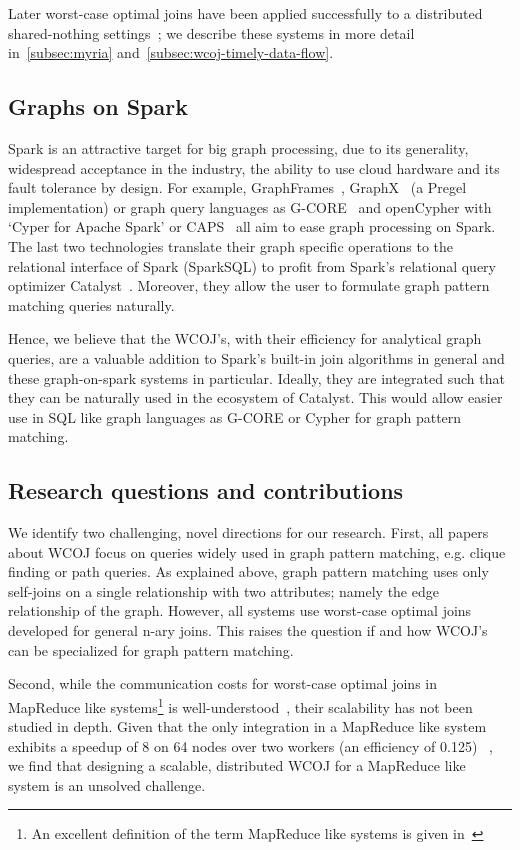 Later worst-case optimal joins have been applied successfully to a distributed shared-nothing settings~\cite{myria-detailed,
ammar2018distributed};
we describe these systems in more detail in~\cref{subsec:myria} and~\ref{subsec:wcoj-timely-data-flow}.

\subsection{Graphs on Spark}\label{subsec:graphs-on-spark}
Spark is an attractive target for big graph processing, due to its generality, widespread acceptance in the industry, the ability to use
cloud hardware and its fault tolerance by design.
For example, GraphFrames~\cite{graphframe}, GraphX~\cite{graphx} (a Pregel~\cite{pregel} implementation) or graph query languages
as \mbox{G-CORE}~\cite{gcore} and \mbox{openCypher} with `Cyper for Apache Spark' or \textsc{CAPS}~\cite{caps} all aim to ease graph
processing on Spark.
The last two technologies translate their graph specific operations to the relational interface of Spark (SparkSQL)
to profit from Spark's relational query optimizer Catalyst~\cite{spark-sql}.
Moreover, they allow the user to formulate graph pattern matching queries naturally.

Hence, we believe that the WCOJ's, with their efficiency for analytical graph queries, are a valuable addition to Spark's
built-in join algorithms in general and these graph-on-spark systems in particular.
Ideally, they are integrated such that they can be naturally used in the ecosystem of Catalyst.
This would allow easier use in SQL like graph languages as \textsc{G-CORE} or Cypher for graph pattern matching.

\subsection{Research questions and contributions}\label{subsec:research-questions-and-contributions}
We identify two challenging, novel directions for our research.
First, all papers about \textsc{WCOJ} focus on queries widely used in graph pattern matching, e.g. clique finding or path queries.
As explained above, graph pattern matching uses only self-joins on a single relationship with two attributes;
namely the edge relationship of the graph.
However, all systems use worst-case optimal joins developed for general n-ary joins.
This raises the question if and how \textsc{WCOJ}'s can be specialized for graph pattern matching.

Second, while the communication costs for worst-case optimal joins in MapReduce like systems\footnote{
An excellent definition of the term MapReduce like systems is given in~\cite{shares}}
is well-understood~\cite{shares,shares-skew,shares-proof,shares-skew-proof},
their scalability has not been studied in depth.
Given that the only integration in a MapReduce like system exhibits a speedup of 8 on 64 nodes over two workers (an efficiency of 0.125)
~\cite{myria-detailed},
we find that designing a scalable, distributed \textsc{WCOJ} for a MapReduce like system is an unsolved challenge.

